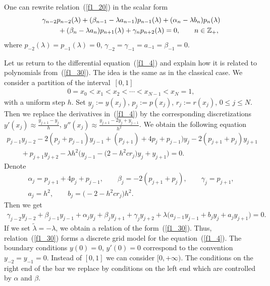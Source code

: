 \documentclass[pdftex]{sigma}
\numberwithin{equation}{section}
\begin{document}
One can rewrite relation~(\ref{f1_20}) in the scalar form
\begin{gather} \gamma_{n-2} p_{n-2}(\lambda) + (\beta_{n-1}-\lambda a_{n-1}) p_{n-1}(\lambda) + (\alpha_n-\lambda b_n) p_n(\lambda) \notag \\
\qquad{} + (\beta_n-\lambda a_n) p_{n+1}(\lambda) + \gamma_n p_{n+2}(\lambda) = 0,\qquad n\in\mathbb{Z}_+, \label{f1_30}
\end{gather}
where $p_{-2}(\lambda) = p_{-1}(\lambda) = 0$, $\gamma_{-2} = \gamma_{-1} = a_{-1} = \beta_{-1} = 0$.

Let us return to the dif\/ferential equation~(\ref{f1_4}) and explain how it is related to polynomials from~(\ref{f1_30}). The idea is the same as in the classical case. We consider a partition of the inter\-val~$[0,1]$
\begin{gather*} 0 = x_0 < x_1 < x_2 < \cdots < x_{N-1} < x_N = 1, \end{gather*}
with a uniform step $h$. Set $y_j := y(x_j)$, $p_j := p(x_j)$, $r_j := r(x_j)$, $0\leq j \leq N$. Then we replace the derivatives in~(\ref{f1_4}) by the corresponding discretizations $y'(x_j) \approx \frac{y_{j+1} - y_j}{h}$, $y''(x_j) \approx \frac{y_{j+1} - 2y_j + y_{j-1}}{h^2}$. We obtain the following equation
\begin{gather*} p_{j-1} y_{j-2} - 2(p_j + p_{j-1}) y_{j-1} + (p_{j+1}) + 4 p_j + p_{j-1}) y_j - 2(p_{j+1} + p_j) y_{j+1} \\
\qquad{} + p_{j+1} y_{j+2} - \lambda h^2 \big(y_{j-1} - \big(2 - h^2 c r_j\big) y_j + y_{j+1}\big)= 0.
\end{gather*}
Denote
\begin{gather*} \alpha_j = p_{j+1} + 4p_j + p_{j-1},\qquad \beta_j = -2(p_{j+1} + p_j),\qquad \gamma_j = p_{j+1}, \\
a_j = h^2,\qquad b_j = \big({-}2-h^2 c r_j\big) h^2.
\end{gather*}
Then we get
\begin{gather*} \gamma_{j-2} y_{j-2} + \beta_{j-1} y_{j-1} + \alpha_j y_j + \beta_j y_{j+1} + \gamma_j y_{j+2} + \lambda \big(
a_{j-1} y_{j-1} + b_j y_j + a_j y_{j+1}\big) = 0.
\end{gather*}
If we set $\widetilde\lambda = -\lambda$, we obtain a relation of the form~(\ref{f1_30}). Thus, relation~(\ref{f1_30}) forms a discrete grid model for the equation~(\ref{f1_4}). The boundary conditions $y(0)=0$, $y'(0)=0$ correspond to the convention $y_{-2}=y_{-1}=0$. Instead of $[0,1]$ we can consider $[0,+\infty)$. The conditions on the right end of the bar we replace by conditions on the left end which are controlled by $\alpha$ and $\beta$.
\end{document}
